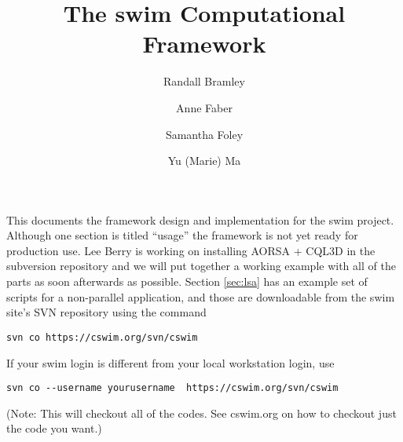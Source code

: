 \documentclass[12pt]{article}
\begin{document}

\title{The \ac{swim} Computational Framework}

\author{Randall Bramley \and Anne Faber \and Samantha Foley \and Yu (Marie) Ma}

\maketitle


This documents the framework design and implementation for the \ac{swim} project.
Although one section is titled ``usage'' the framework is not yet ready for
production use. Lee Berry is working on installing AORSA + CQL3D in the
subversion repository and we will put together a working example with all
of the parts as soon afterwards as possible.
Section \ref{sec:lsa} has an example set of scripts for a
non-parallel application, and those are downloadable from the \ac{swim} site's SVN
repository using the command
\begin{verbatim}
svn co https://cswim.org/svn/cswim
\end{verbatim}
If your \ac{swim} login is different from your local workstation login, use
\begin{verbatim}
svn co --username yourusername  https://cswim.org/svn/cswim
\end{verbatim}
(Note: This will checkout all of the codes. See cswim.org on how to checkout
just the code you want.)

% 





\newpage
\appendix


%
%
% 

\end{document}
